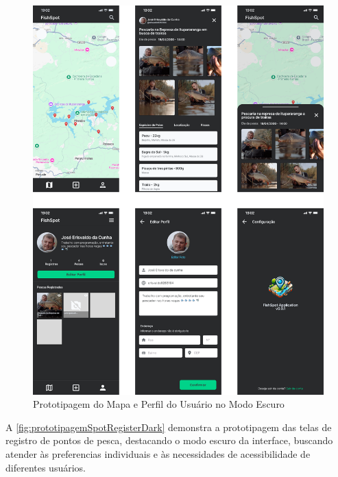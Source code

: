 \begin{figure}[H]
    \centering
    \caption{Prototipagem do Mapa e Perfil do Usuário no Modo Escuro}
    \label{fig:prototipagemMapPerfilDark}
    \includegraphics[scale=0.30]{./dados/figuras/prototipagem-dark-map-perfil.png}
\end{figure}

A \autoref{fig:prototipagemSpotRegisterDark} demonstra a prototipagem das telas de registro de pontos de pesca, destacando o modo escuro da interface, buscando atender às preferencias individuais e às necessidades de acessibilidade de diferentes usuários.


